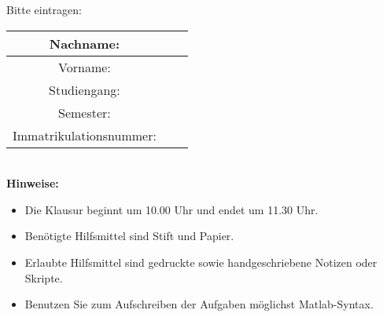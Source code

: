 \bigskip\bigskip\bigskip
Bitte eintragen:\\
\begin{center}
\begin{tabular}{|Sl|p{8cm}|}
\hline
Nachname: & \\
\hline
Vorname: & \\
\hline
Studiengang: & \\
\hline 
Semester: & \\
\hline 
Immatrikulationsnummer: & \\
\hline
\end{tabular}\\[1cm]
\textbf{Hinweise:}
\begin{itemize}
\item Die Klausur beginnt um 10.00 Uhr und endet um 11.30 Uhr.
\item Ben\"otigte Hilfsmittel sind Stift und Papier.
\item Erlaubte Hilfsmittel sind gedruckte sowie handgeschriebene Notizen oder Skripte. 
\item Benutzen Sie zum Aufschreiben der Aufgaben möglichst Matlab-Syntax.
\end{itemize}
\end{center}

\newpage
\normalsize
